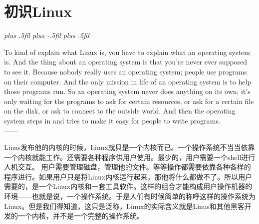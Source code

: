 \documentclass[amstex,twoside]{ctexbook}
\newcommand{\RTLpar}{%
  \leftskip=0pt plus .5fil%
  \rightskip=0pt plus -.5fil%
  \parfillskip=0pt plus .5fil%
}
\newenvironment{quotes}[2][0.55]{\pushQED{#2}%
\begin{flushright}%
\begin{minipage}{#1\textwidth}\begin{flushright}\noindent\it\RTLpar}{%
 \\------\popQED{}\end{flushright}\end{minipage}\end{flushright}\vskip 8mm }%
\begin{document}
{



}

\tableofcontents

\ifdefined\compileall
	
\else
	\addtocounter{chapter}{1}
\fi



\ifdefined\compileall

\else
\addtocounter{chapter}{1}
\fi 

\ifdefined\compileall

\else
\addtocounter{chapter}{1}
\fi 


\chapter{初识Linux}

\begin{quotes}[0.63]{Linus~Torvalds}
To kind of explain what Linux is, you have to explain what an operating system is. And the thing about an operating system is that you're never ever supposed to see it. Because nobody really uses an operating system; people use programs on their computer. And the only mission in life of an operating system is to help those programs run. So an operating system never does anything on its own; it's only waiting for the programs to ask for certain resources, or ask for a certain file on the disk, or ask to connect to the outside world. And then the operating system steps in and tries to make it easy for people to write programs.
\end{quotes}

Linus发布他的内核的时候，Linux就只是一个内核而已。一个操作系统不当当依靠一个内核就能工作。还需要各种程序供用户使用。最少的，用户需要一个shell进行人机交互。
用户需要管理磁盘，管理他的文件。等等操作都需要依靠各种各样的程序进行。如果用户只是将Linux内核运行起来，那他将什么都做不了。所以用户需要的，是一个Linux内核和一套工具软件。这样的组合才能构成用户操作机器的环境——也就是说，一个操作系统。于是人们有时候简单的称呼这样的操作系统为Linux。但是我们得知道，这只是泛称，Linux的实际含义就是Linus和其他黑客开发的一个内核，并不是一个完整的操作系统。
\end{document}
